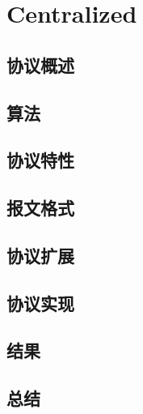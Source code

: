 \section{Centralized}
\subsection{协议概述} %
	\label{sub:协议概述}
	
	\subsection{算法} %
	\label{sub:算法}
	
	\subsection{协议特性} %
	\label{sub:协议特性}
	
	\subsection{报文格式} %
	\label{sub:报文格式}
	
	\subsection{协议扩展} %
	\label{sub:协议扩展}
	
	\subsection{协议实现} %
	\label{sub:协议实现}
	
	\subsection{结果} %
	\label{sub:结果}
	
	\subsection{总结} %
	\label{sub:总结}
	
